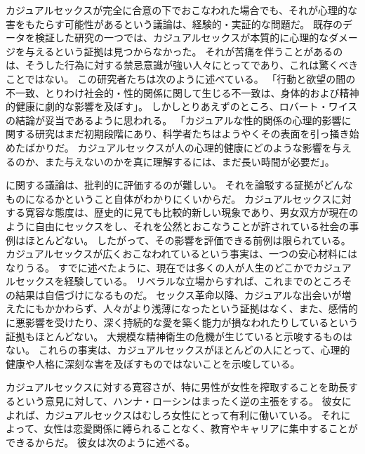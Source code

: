 \documentclass[paper=a4,book,openany]{jlreq}
\newcommand{\ig}[1]{}           %
\begin{document}
カジュアルセックスが完全に合意の下でおこなわれた場合でも、それが心理的な害をもたらす可能性があるという議論は、経験的・実証的な問題だ。
既存のデータを検証した研究の一つでは、カジュアルセックスが本質的に心理的なダメージを与えるという証拠は見つからなかった。
それが苦痛を伴うことがあるのは、そうした行為に対する禁忌意識が強い人々にとってであり、これは驚くべきことではない。
この研究者たちは次のように述べている。
「行動と欲望の間の不一致、とりわけ社会的・性的関係に関して生じる不一致は、身体的および精神的健康に劇的な影響を及ぼす」\citep{garcia12:_sexual_hookup_cultur}。
しかしとりあえずのところ、ロバート・ワイス\ig{Robert Weiss}の結論が妥当であるように思われる。
「カジュアルな性的関係の心理的影響に関する研究はまだ初期段階にあり、科学者たちはようやくその表面を引っ掻き始めたばかりだ。
カジュアルセックスが人の心理的健康にどのような影響を与えるのか、また与えないのかを真に理解するには、まだ長い時間が必要だ」\citep{weiss15:_what_are_psyc}。

に関する議論は、批判的に評価するのが難しい。
それを論駁する証拠がどんなものになるかということ自体がわかりにくいからだ。
カジュアルセックスに対する寛容な態度は、歴史的に見ても比較的新しい現象であり、男女双方が現在のように自由にセックスをし、それを公然とおこなうことが許されている社会の事例はほとんどない。
したがって、その影響を評価できる前例は限られている。
カジュアルセックスが広くおこなわれているという事実は、一つの安心材料にはなりうる。
すでに述べたように、現在では多くの人が人生のどこかでカジュアルセックスを経験している。
リベラルな立場からすれば、これまでのところその結果は自信づけになるものだ。
セックス革命以降、カジュアルな出会いが増えたにもかかわらず、人々がより浅薄になったという証拠はなく、また、感情的に悪影響を受けたり、深く持続的な愛を築く能力が損なわれたりしているという証拠もほとんどない。
大規模な精神衛生の危機が生じていると示唆するものはない。
これらの事実は、カジュアルセックスがほとんどの人にとって、心理的健康や人格に深刻な害を及ぼすものではないことを示唆している。

カジュアルセックスに対する寛容さが、特に男性が女性を搾取することを助長するという意見に対して、ハンナ・ローシンはまったく逆の主張をする。
彼女によれば、カジュアルセックスはむしろ女性にとって有利に働いている。
それによって、女性は恋愛関係に縛られることなく、教育やキャリアに集中することができるからだ。
彼女は次のように述べる。
\end{document}
